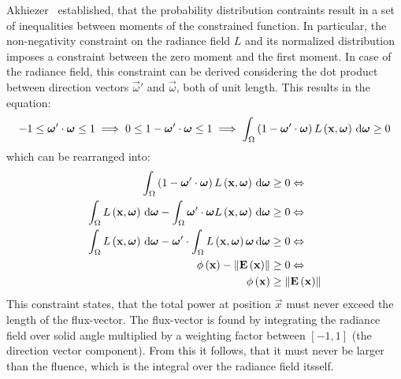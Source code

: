 Akhiezer~\cite{Akhiezer65} established, that the probability distribution contraints result in a set of inequalities between moments of the constrained function. In particular, the non-negativity constraint on the radiance field $L$ and its normalized distribution imposes a constraint between the zero moment and the first moment. In case of the radiance field, this constraint can be derived considering the dot product between direction vectors $\vec{\omega}'$ and $\vec{\omega}$, both of unit length. This results in the equation:
\begin{align*}
-1 \le \boldsymbol{\mathbf{\omega}}'\cdot\boldsymbol{\mathbf{\omega}} \le 1
\implies
0 \le 1 - \boldsymbol{\mathbf{\omega}}'\cdot\boldsymbol{\mathbf{\omega}} \le 1
\implies
\int_{\Omega}{\left(1-\boldsymbol{\mathbf{\omega}}'\cdot\boldsymbol{\mathbf{\omega}}\right)L\left(\boldsymbol{\mathbf{x}}, \boldsymbol{\mathbf{\omega}}\right)\,\mathrm{d}\boldsymbol{\mathbf{\omega}}}\ge 0
\end{align*}
which can be rearranged into:
\begin{align*}
\int_{\Omega}{\left(1-\boldsymbol{\mathbf{\omega}}'\cdot\boldsymbol{\mathbf{\omega}}\right)L\left(\boldsymbol{\mathbf{x}}, \boldsymbol{\mathbf{\omega}}\right)\,\mathrm{d}\boldsymbol{\mathbf{\omega}}} &\ge 0
\Leftrightarrow
\\
\int_{\Omega}{L\left(\boldsymbol{\mathbf{x}}, \boldsymbol{\mathbf{\omega}}\right)\,\mathrm{d}\boldsymbol{\mathbf{\omega}}}
-\int_{\Omega}{\boldsymbol{\mathbf{\omega}}'\cdot\boldsymbol{\mathbf{\omega}} L\left(\boldsymbol{\mathbf{x}}, \boldsymbol{\mathbf{\omega}}\right)\,\mathrm{d}\boldsymbol{\mathbf{\omega}}}
&\ge 0
\Leftrightarrow
\\
\int_{\Omega}{L\left(\boldsymbol{\mathbf{x}}, \boldsymbol{\mathbf{\omega}}\right)\,\mathrm{d}\boldsymbol{\mathbf{\omega}}}
-\boldsymbol{\mathbf{\omega}}'\cdot\int_{\Omega}{L\left(\boldsymbol{\mathbf{x}}, \boldsymbol{\mathbf{\omega}}\right)\boldsymbol{\mathbf{\omega}}\,\mathrm{d}\boldsymbol{\mathbf{\omega}}}
&\ge 0
\Leftrightarrow
\\
\phi\left(\boldsymbol{\mathbf{x}}\right)
-\left\lVert\boldsymbol{\mathbf{E}}\left(\boldsymbol{\mathbf{x}}\right)\right\rVert
&\ge 0
\Leftrightarrow
\\
\phi\left(\boldsymbol{\mathbf{x}}\right)
&\ge \left\lVert\boldsymbol{\mathbf{E}}\left(\boldsymbol{\mathbf{x}}\right)\right\rVert
\end{align*}
This constraint states, that the total power at position $\vec{x}$ must never exceed the length of the flux-vector. The flux-vector is found by integrating the radiance field over solid angle multiplied by a weighting factor between $\left[-1, 1\right]$ (the direction vector component). From this it follows, that it must never be larger than the fluence, which is the integral over the radiance field itsself.

